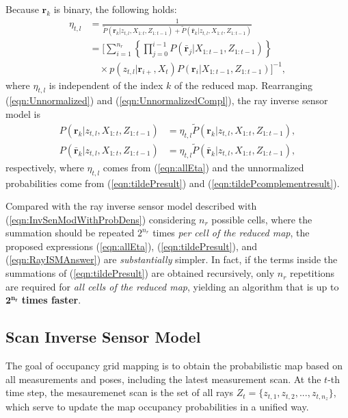 \documentclass[letterpaper, 10pt, conference]{ieeeconf}
\newcommand{\refeqn}[1]{(\ref{eqn:#1})}
\begin{document}
Because $\mathbf{r}_k$ is binary, the following holds:
\begin{align}
\label{eqn:allEta}
\eta_{t,l}&=\frac1{\tilde P(\mathbf{r}_k|z_{t,l},X_{1:t},Z_{1:t-1})+\tilde P(\bar{\mathbf{r}}_k|z_{t,l},X_{1:t},Z_{1:t-1})}\nonumber
\\
&=
\bigg[\sum_{i=1}^{n_r}\left\{\prod_{j=0}^{i-1}P(\bar{\mathbf{r}}_j|X_{1:t-1},Z_{1:t-1})\right\}\nonumber\\&\quad\times p(z_{t,l}|\mathbf{r}_{i+},X_t)P(\mathbf{r}_i|X_{1:t-1},Z_{1:t-1})\bigg]^{-1},
\end{align}
where $\eta_{t,l}$ is independent of the index $k$ of the reduced map.
Rearranging \refeqn{Unnormalized} and \refeqn{UnnormalizedCompl}, the ray inverse sensor model is 
\begin{align}
\label{eqn:RayISMAnswer}
P(\mathbf{r}_k|z_{t,l},X_{1:t},Z_{1:t-1})&=\eta_{t,l}\tilde P(\mathbf{r}_k|z_{t,l},X_{1:t},Z_{1:t-1}),
\\
P(\bar{\mathbf{r}}_k|z_{t,l},X_{1:t},Z_{1:t-1})&=\eta_{t,l}\tilde P(\bar{\mathbf{r}}_k|z_{t,l},X_{1:t},Z_{1:t-1}),
\end{align}
respectively, where $\eta_{t,l}$ comes from \refeqn{allEta} and the unnormalized probabilities come from \refeqn{tildePresult} and \refeqn{tildePcomplementresult}.

Compared with the ray inverse sensor model described with \refeqn{InvSenModWithProbDens} considering $n_r$ possible cells, where the summation should be repeated $2^{n_r}$ times \emph{per cell of the reduced map}, the proposed expressions  \refeqn{allEta}, \refeqn{tildePresult}, and \refeqn{RayISMAnswer} are \textit{substantially} simpler.
In fact, if the terms inside the summations of \refeqn{tildePresult} are obtained recursively, only $n_r$ repetitions are required for \emph{all cells of the reduced map}, yielding an algorithm that is up to $\mathbf{2^{n_r}}$ \textbf{times faster}.

\subsection{Scan Inverse Sensor Model}

The goal of occupancy grid mapping is to obtain the probabilistic map based on all measurements and poses, including the latest measurement scan.
At the $t$-th time step, the mesauremenet scan is the set of all rays $Z_t=\{z_{t,1},z_{t,2},...,z_{t,n_z}\}$, which serve to update the map occupancy probabilities in a unified way.
\end{document}
